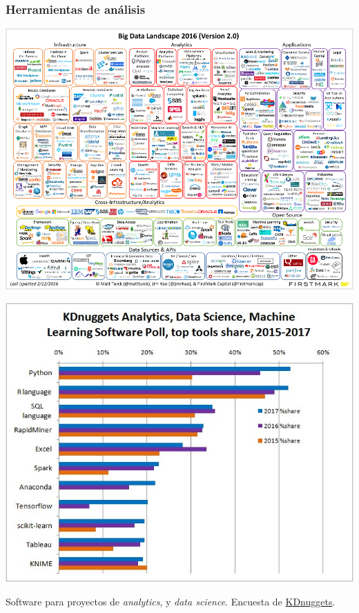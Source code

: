 \documentclass{beamer}
\begin{document}
\begin{frame}[plain]
\frametitle{Herramientas de análisis}

\begin{center}
\includegraphics[width=\textwidth]{big_data_landscape.png}
\end{center}
\end{frame}


\begin{frame}[plain]
\begin{center}
\includegraphics[height=0.75\textheight]{top-analytics-data-science-machine-learning-software-2015-2017.jpg}
\end{center}
{\footnotesize Software para proyectos de \textit{analytics}, y \textit{data science}. Encuesta de \href{https://www.kdnuggets.com/2017/05/poll-analytics-data-science-machine-learning-software-leaders.html}{KDnuggets}.}
\end{frame}
\end{document}
